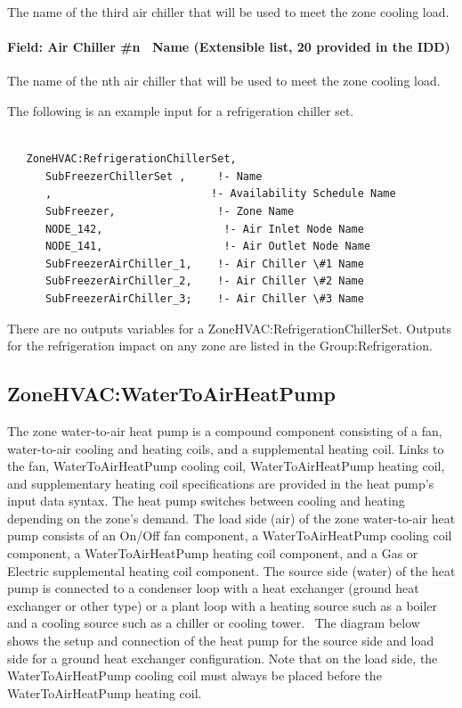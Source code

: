 The name of the third air chiller that will be used to meet the zone cooling load.

\paragraph{Field: Air Chiller \#n ~Name (Extensible list, 20 provided in the IDD)}\label{field-air-chiller-n-name-extensible-list-20-provided-in-the-idd}

The name of the nth air chiller that will be used to meet the zone cooling load.

The following is an example input for a refrigeration chiller set.

\begin{lstlisting}

   ZoneHVAC:RefrigerationChillerSet,
      SubFreezerChillerSet ,     !- Name
      ,                         !- Availability Schedule Name
      SubFreezer,                !- Zone Name
      NODE_142,                   !- Air Inlet Node Name
      NODE_141,                   !- Air Outlet Node Name
      SubFreezerAirChiller_1,    !- Air Chiller \#1 Name
      SubFreezerAirChiller_2,    !- Air Chiller \#2 Name
      SubFreezerAirChiller_3;    !- Air Chiller \#3 Name
\end{lstlisting}

There are no outputs variables for a ZoneHVAC:RefrigerationChillerSet. Outputs for the refrigeration impact on any zone are listed in the Group:Refrigeration.

\subsection{ZoneHVAC:WaterToAirHeatPump}\label{zonehvacwatertoairheatpump}

The zone water-to-air heat pump is a compound component consisting of a fan, water-to-air cooling and heating coils, and a supplemental heating coil. Links to the fan, WaterToAirHeatPump cooling coil, WaterToAirHeatPump heating coil, and supplementary heating coil specifications are provided in the heat pump's input data syntax. The heat pump switches between cooling and heating depending on the zone's demand. The load side (air) of the zone water-to-air heat pump consists of an On/Off fan component, a WaterToAirHeatPump cooling coil component, a WaterToAirHeatPump heating coil component, and a Gas or Electric supplemental heating coil component. The source side (water) of the heat pump is connected to a condenser loop with a heat exchanger (ground heat exchanger or other type) or a plant loop with a heating source such as a boiler and a cooling source such as a chiller or cooling tower.~ The diagram below shows the setup and connection of the heat pump for the source side and load side for a ground heat exchanger configuration. Note that on the load side, the WaterToAirHeatPump cooling coil must always be placed before the WaterToAirHeatPump heating coil.

